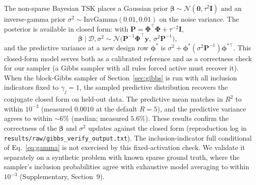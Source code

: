 \documentclass[review,1p,times]{elsarticle}
\begin{document}
The non-sparse Bayesian TSK places a Gaussian prior $\boldsymbol{\beta}\sim\mathcal{N}(\mathbf{0},\tau^2\mathbf{I})$ and an inverse-gamma prior $\sigma^2\sim\mathrm{InvGamma}(0.01,0.01)$ on the noise variance. The posterior is available in closed form: with $\mathbf{P}=\boldsymbol{\Phi}^{\top}\boldsymbol{\Phi}+\tau^{-2}\mathbf{I}$,
\begin{equation}
 \boldsymbol{\beta}\mid\mathcal{D},\sigma^2 \sim \mathcal{N}\big(\mathbf{P}^{-1}\boldsymbol{\Phi}^{\top}\mathbf{y},\ \sigma^2\mathbf{P}^{-1}\big),
\end{equation}
and the predictive variance at a new design row $\boldsymbol{\phi}^*$ is $\sigma^2 + \boldsymbol{\phi}^*(\sigma^2\mathbf{P}^{-1})\boldsymbol{\phi}^{*\top}$. This closed-form model serves both as a calibrated reference and as a correctness check for our sampler (a Gibbs sampler with all rules forced active must recover it).
When the block-Gibbs sampler of Section~\ref{sec:gibbs} is run with all inclusion indicators fixed to $\gamma_j=1$, the sampled predictive distribution recovers the conjugate closed form on held-out data.
The predictive mean matches in $R^2$ to within $10^{-3}$ (measured $0.0010$ at the default $R=5$), and the predictive variance agrees to within $\sim$6\% (median; measured $5.6\%$).
These results confirm the correctness of the $\boldsymbol{\beta}$ and $\sigma^2$ updates against the closed form (reproduction log in \texttt{results/raw/gibbs\_verify\_output.txt}).
The inclusion-indicator full conditional of Eq.~\eqref{eq:gamma} is not exercised by this fixed-activation check.
We validate it separately on a synthetic problem with known sparse ground truth, where the sampler's inclusion probabilities agree with exhaustive model averaging to within $10^{-3}$ (Supplementary, Section~9).
\end{document}
